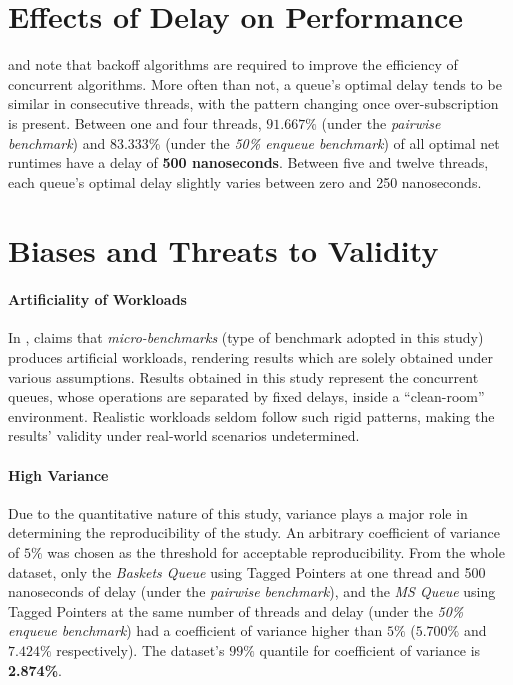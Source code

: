 \section{Effects of Delay on Performance}
\citeauthor{valois1995datastructures} and \citeauthor{hoffman2007baskets}
\citep{valois1995datastructures,hoffman2007baskets} note that backoff
algorithms are required to improve the efficiency of concurrent algorithms.
More often than not, a queue's optimal delay tends to be similar in consecutive
threads, with the pattern changing once over-subscription is present. Between
one and four threads, \textbf{$91.667\%$} (under the \emph{pairwise benchmark})
and \textbf{$83.333\%$} (under the \emph{50\% enqueue benchmark}) of all optimal net
runtimes have a delay of \textbf{500 nanoseconds}. Between five and twelve threads,
each queue's optimal delay slightly varies between zero and 250 nanoseconds. 


\section{Biases and Threats to Validity}
\paragraph{Artificiality of Workloads}
In \citep{gregg2014systems}, \citeauthor{gregg2014systems} claims that
\emph{micro-benchmarks} (type of benchmark adopted in this study) produces
artificial workloads, rendering results which are  solely obtained under
various assumptions. Results obtained in this study represent the concurrent
queues, whose operations are separated by fixed delays, inside a ``clean-room''
environment. Realistic workloads seldom follow such rigid patterns, making the
results' validity under real-world scenarios undetermined.

\paragraph{High Variance} Due to the quantitative nature of this study,
variance plays a major role in determining the reproducibility of the study. An
arbitrary coefficient of variance of $5\%$ was chosen as the threshold for
acceptable reproducibility. From the whole dataset, only the \emph{Baskets Queue} using Tagged Pointers at
one thread and 500 nanoseconds of delay (under the \emph{pairwise benchmark}), and
the \emph{MS Queue} using Tagged Pointers at the same number of threads and
delay (under the \emph{50\% enqueue benchmark}) had a coefficient of variance
higher than $5\%$ ($5.700\%$ and $7.424\%$ respectively). The dataset's $99\%$
quantile for coefficient of variance is \textbf{2.874\%}.

